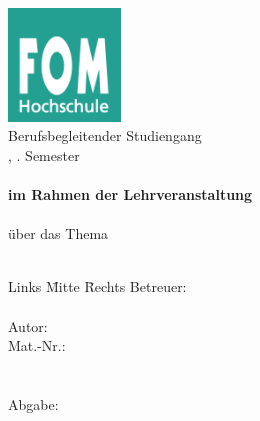 \documentclass[12pt,oneside,titlepage,listof=totoc,bibliography=totoc]{scrartcl}
\begin{document}
\begin{titlepage}
	\begin{center}
		\textbf{\myHochschulName}\\
		\textbf{\myHochschulStandort}\\
		\vspace{1.5cm}
			\includegraphics[width=3cm]{abbildungen/fomLogo.jpg} \\
		\vspace{1.5cm}
		Berufsbegleitender Studiengang\\
		\myStudiengang, \mySemesterZahl. Semester\\
		\vspace{2cm}
		\textbf{\myThesisArt}\\
		\textbf{im Rahmen der Lehrveranstaltung}\\
		\textbf{\myLehrveranstaltung}\\
		\vspace{2cm}
		über das Thema\\
		\Huge{\myTitel}\\
		\vspace{0.2cm}
	\end{center}
	\normalsize
	\vfill
	\begin{tabbing}
		Links \= Mitte \= Rechts\kill
		Betreuer: \> \> \myBetreuer\\
		\> \> \\

		Autor: \> \> \myAutor\\
		Mat.-Nr.: \> \>  \myMatrikelNr\\
		\> \> \myAdresse\\
		\> \> \\
		Abgabe: \> \> \myAbgabeDatum
	\end{tabbing}
\end{titlepage}


%
\end{document}
